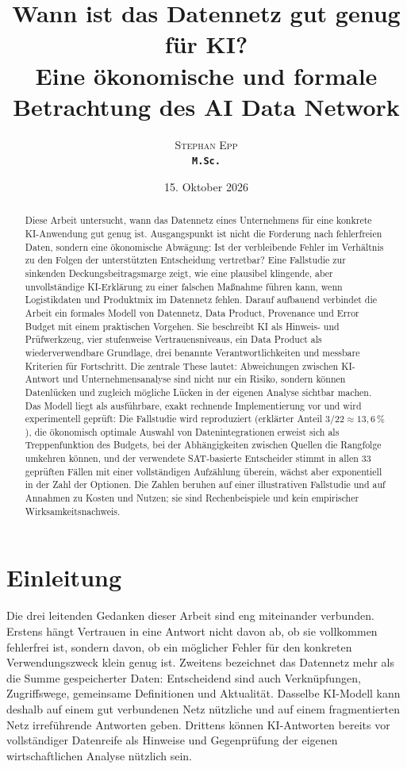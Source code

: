 \documentclass[a4paper,12pt,twoside]{report}
\title{\textbf{Wann ist das Datennetz gut genug für KI?}\\\large Eine ökonomische und formale Betrachtung des AI Data Network}
\author{\textsc{Stephan Epp}\\ {\small \texttt{\textbf{M.Sc.}}}}
\date{15. Oktober 2026}
\theoremstyle{definition}
\begin{document}
\maketitle

\begin{abstract}
Diese Arbeit untersucht, wann das Datennetz eines Unternehmens für eine konkrete KI-Anwendung gut genug ist. Ausgangspunkt ist nicht die Forderung nach fehlerfreien Daten, sondern eine ökonomische Abwägung: Ist der verbleibende Fehler im Verhältnis zu den Folgen der unterstützten Entscheidung vertretbar? Eine Fallstudie zur sinkenden Deckungsbeitragsmarge zeigt, wie eine plausibel klingende, aber unvollständige KI-Erklärung zu einer falschen Maßnahme führen kann, wenn Logistikdaten und Produktmix im Datennetz fehlen. Darauf aufbauend verbindet die Arbeit ein formales Modell von Datennetz, Data Product, Provenance und Error Budget mit einem praktischen Vorgehen. Sie beschreibt KI als Hinweis- und Prüfwerkzeug, vier stufenweise Vertrauensniveaus, ein Data Product als wiederverwendbare Grundlage, drei benannte Verantwortlichkeiten und messbare Kriterien für Fortschritt. Die zentrale These lautet: Abweichungen zwischen KI-Antwort und Unternehmensanalyse sind nicht nur ein Risiko, sondern können Datenlücken und zugleich mögliche Lücken in der eigenen Analyse sichtbar machen. Das Modell liegt als ausführbare, exakt rechnende Implementierung vor und wird experimentell geprüft: Die Fallstudie wird reproduziert (erklärter Anteil $3/22\approx 13{,}6\,\%$), die ökonomisch optimale Auswahl von Datenintegrationen erweist sich als Treppenfunktion des Budgets, bei der Abhängigkeiten zwischen Quellen die Rangfolge umkehren können, und der verwendete SAT-basierte Entscheider stimmt in allen 33 geprüften Fällen mit einer vollständigen Aufzählung überein, wächst aber exponentiell in der Zahl der Optionen. Die Zahlen beruhen auf einer illustrativen Fallstudie und auf Annahmen zu Kosten und Nutzen; sie sind Rechenbeispiele und kein empirischer Wirksamkeitsnachweis.
\end{abstract}

\tableofcontents
\newpage

\chapter{Einleitung}
Die drei leitenden Gedanken dieser Arbeit sind eng miteinander verbunden. Erstens hängt Vertrauen in eine Antwort nicht davon ab, ob sie vollkommen fehlerfrei ist, sondern davon, ob ein möglicher Fehler für den konkreten Verwendungszweck klein genug ist. Zweitens bezeichnet das Datennetz mehr als die Summe gespeicherter Daten: Entscheidend sind auch Verknüpfungen, Zugriffswege, gemeinsame Definitionen und Aktualität. Dasselbe KI-Modell kann deshalb auf einem gut verbundenen Netz nützliche und auf einem fragmentierten Netz irreführende Antworten geben. Drittens können KI-Antworten bereits vor vollständiger Datenreife als Hinweise und Gegenprüfung der eigenen wirtschaftlichen Analyse nützlich sein.
\end{document}
